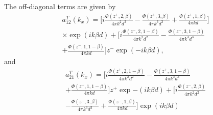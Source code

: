 \documentclass[aps,pra,reprint,groupedaddress,nofootinbib,longbibliography,showpacs]{revtex4-1}
\begin{document}
The off-diagonal terms are given by
\begin{equation}
\begin{split}
&a_{12}^{T}(k_x)=\Big[i\frac{\Phi(z^+,2,\beta)}{4\pi k^2d^2}-\frac{\Phi(z^+,3,\beta)}{4\pi k^3d^3}+\frac{\Phi(z^+,1,\beta)}{4\pi kd}\Big]\\&\times\exp{(ik\beta d)}+\Big[i\frac{\Phi(z^-,2,1-\beta)}{4\pi k^2d^2}-\frac{\Phi(z^-,3,1-\beta)}{4\pi k^3d^3}\\&+\frac{\Phi(z^-,1,1-\beta)}{4\pi kd}\Big]z^-\exp{(-ik\beta d)},
\end{split}
\end{equation}
and
\begin{equation}
\begin{split}
&a_{21}^{T}(k_x)=\Big[i\frac{\Phi(z^+,2,1-\beta)}{4\pi k^2d^2}-\frac{\Phi(z^+,3,1-\beta)}{4\pi k^3d^3}\\&+\frac{\Phi(z^+,1,1-\beta)}{4\pi kd}\Big]z^+\exp{-(ik\beta d)}+\Big[i\frac{\Phi(z^-,2,\beta)}{4\pi k^2d^2}\\&-\frac{\Phi(z^-,3,\beta)}{4\pi k^3d^3}+\frac{\Phi(z^-,1,\beta)}{4\pi kd}\Big]\exp{(ik\beta d)}
\end{split}
\end{equation}
\end{document}
